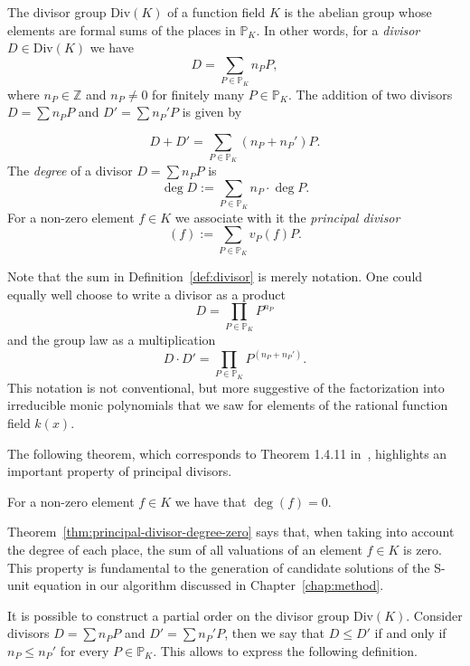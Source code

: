 \begin{definition}%
  \label{def:divisor}
  The divisor group \(\mathrm{Div}(K)\) of a function field \(K\) is the abelian group whose elements are formal sums of the places in \(\mathbb{P}_{K}\). In other words, for a \textit{divisor} \(D \in \mathrm{Div}(K)\) we have
  \[D = \sum_{P \in \mathbb{P}_{K}} n_{P} P,\]
  where \(n_{P} \in \mathbb{Z}\) and \(n_{P} \neq 0\) for finitely many \(P \in \mathbb{P}_{K}\). The addition of two divisors \({D = \sum n_{P}P}\) and \({D' = \sum n_{P}'P}\) is given by

  \[D + D' = \sum_{P \in \mathbb{P}_{K}} \left( n_{P} + n_{P}' \right) P.\]
  The \textit{degree} of a divisor \({D = \sum n_{P}P}\) is
  \[\deg{D} := \sum_{P \in \mathbb{P}_{K}} n_{P} \cdot \deg{P}.\]
  For a non-zero element \(f \in K\) we associate with it the \textit{principal divisor}
  \[(f) := \sum_{P \in \mathbb{P}_{K}} v_{P}(f) P.\]
\end{definition}

Note that the sum in Definition~\ref{def:divisor} is merely notation. One could equally well choose to write a divisor as a product
\[D = \prod_{P \in \mathbb{P}_{K}} P^{n_{P}}\]
and the group law as a multiplication
\[D \cdot D' = \prod_{P \in \mathbb{P}_{K}} P^{\left(n_{P} + n_{P}'\right)}.\]
This notation is not conventional, but more suggestive of the factorization into irreducible monic polynomials that we saw for elements of the rational function field \(k(x)\).

The following theorem, which corresponds to Theorem 1.4.11 in~\cite{stichtenoth-2009-algebraic-function-fields}, highlights an important property of principal divisors.

\begin{theorem}%
  \label{thm:principal-divisor-degree-zero}
  For a non-zero element \(f \in K\) we have that \(\deg{(f)} = 0\).
\end{theorem}

Theorem~\ref{thm:principal-divisor-degree-zero} says that, when taking into account the degree of each place, the sum of all valuations of an element \(f \in K\) is zero. This property is fundamental to the generation of candidate solutions of the S-unit equation in our algorithm discussed in Chapter~\ref{chap:method}.

It is possible to construct a partial order on the divisor group \(\mathrm{Div}(K)\). Consider divisors \({D = \sum n_{P}P}\) and \({D' = \sum n_{P}'P}\), then we say that \(D \leq D'\) if and only if \(n_{P} \leq n_{P}'\) for every \(P \in \mathbb{P}_{K}\). This allows to express the following definition.


